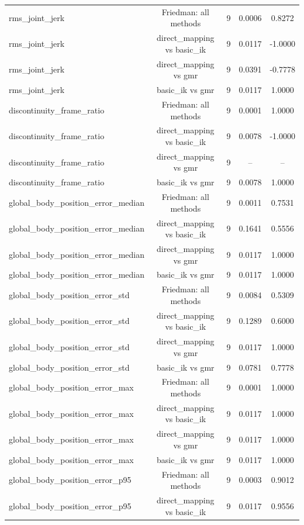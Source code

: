 \begin{table}[t]
{\begin{tabular}{lcccc}
rms\_joint\_jerk & Friedman: all methods & 9 & 0.0006 & 0.8272 \\
rms\_joint\_jerk & direct\_mapping vs basic\_ik & 9 & 0.0117 & -1.0000 \\
rms\_joint\_jerk & direct\_mapping vs gmr & 9 & 0.0391 & -0.7778 \\
rms\_joint\_jerk & basic\_ik vs gmr & 9 & 0.0117 & 1.0000 \\
discontinuity\_frame\_ratio & Friedman: all methods & 9 & 0.0001 & 1.0000 \\
discontinuity\_frame\_ratio & direct\_mapping vs basic\_ik & 9 & 0.0078 & -1.0000 \\
discontinuity\_frame\_ratio & direct\_mapping vs gmr & 9 & -- & -- \\
discontinuity\_frame\_ratio & basic\_ik vs gmr & 9 & 0.0078 & 1.0000 \\
global\_body\_position\_error\_median & Friedman: all methods & 9 & 0.0011 & 0.7531 \\
global\_body\_position\_error\_median & direct\_mapping vs basic\_ik & 9 & 0.1641 & 0.5556 \\
global\_body\_position\_error\_median & direct\_mapping vs gmr & 9 & 0.0117 & 1.0000 \\
global\_body\_position\_error\_median & basic\_ik vs gmr & 9 & 0.0117 & 1.0000 \\
global\_body\_position\_error\_std & Friedman: all methods & 9 & 0.0084 & 0.5309 \\
global\_body\_position\_error\_std & direct\_mapping vs basic\_ik & 9 & 0.1289 & 0.6000 \\
global\_body\_position\_error\_std & direct\_mapping vs gmr & 9 & 0.0117 & 1.0000 \\
global\_body\_position\_error\_std & basic\_ik vs gmr & 9 & 0.0781 & 0.7778 \\
global\_body\_position\_error\_max & Friedman: all methods & 9 & 0.0001 & 1.0000 \\
global\_body\_position\_error\_max & direct\_mapping vs basic\_ik & 9 & 0.0117 & 1.0000 \\
global\_body\_position\_error\_max & direct\_mapping vs gmr & 9 & 0.0117 & 1.0000 \\
global\_body\_position\_error\_max & basic\_ik vs gmr & 9 & 0.0117 & 1.0000 \\
global\_body\_position\_error\_p95 & Friedman: all methods & 9 & 0.0003 & 0.9012 \\
global\_body\_position\_error\_p95 & direct\_mapping vs basic\_ik & 9 & 0.0117 & 0.9556 \\

\end{tabular}}
\end{table}
